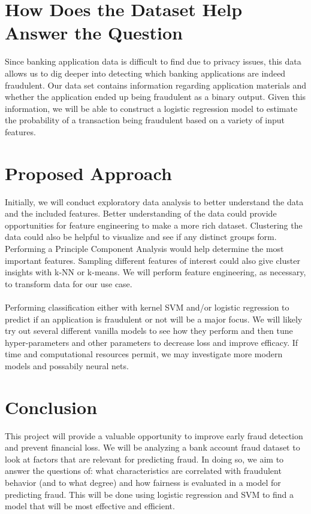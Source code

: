 \documentclass{article}
\begin{document}
\section*{How Does the Dataset Help Answer the Question}
Since banking application data is difficult to find due to privacy issues, this data allows us to dig deeper into detecting which banking applications are indeed fraudulent. Our data set contains information regarding application materials and whether the application ended up being fraudulent as a binary output. Given this information, we will be able to construct a logistic regression model to estimate the probability of a transaction being fraudulent based on a variety of input features. 

\section*{Proposed Approach}

Initially, we will conduct exploratory data analysis to better understand the data and the included features. Better understanding of the data could provide opportunities for feature engineering to make a more rich dataset. Clustering the data could also be helpful to visualize and see if any distinct groups form. Performing a Principle Component Analysis would help determine the most important features. Sampling different features of interest could also give cluster insights with k-NN or k-means. We will perform feature engineering, as necessary, to transform data for our use case.
\\
\\
Performing classification either with kernel SVM and/or logistic regression to predict if an application is fraudulent or not will be a major focus. We will likely try out several different vanilla models to see how they perform and then tune hyper-parameters and other parameters to decrease loss and improve efficacy. If time and computational resources permit, we may investigate more modern models and possabily neural nets.

\section*{Conclusion}

This project will provide a valuable opportunity to improve early fraud detection and prevent financial loss. We will be analyzing a bank account fraud dataset to look at factors that are relevant for predicting fraud. In doing so, we aim to answer the questions of: what characteristics are correlated with fraudulent behavior (and to what degree) and how fairness is evaluated in a model for predicting fraud. This will be done using logistic regression and SVM to find a model that will be most effective and efficient.
\end{document}
